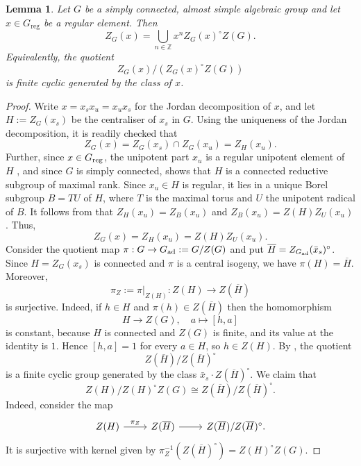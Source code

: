 \documentclass[12pt, a4paper, oneside]{amsart}
\theoremstyle{plain} %
\newtheorem{lemma}[theorem]{Lemma}
\theoremstyle{definition} %
\theoremstyle{remark} %
\begin{document}
\begin{lemma}\label{lem:regular-centraliser-components}
Let $G$ be a simply connected, almost simple algebraic group and let $x\in G_{\mathrm{reg}}$ be a regular element. Then
\[Z_G(x)=\bigcup_{ n\in\mathbb Z}x^{n}Z_G(x)^\circ Z(G).\]
Equivalently, the quotient
\[Z_G(x)/(Z_G(x)^\circ Z(G))\]
is finite cyclic generated by the class of $x$.
\end{lemma}
\begin{proof}
Write $x=x_sx_u=x_ux_s$ for the Jordan decomposition of $x$, and let $H:=Z_G(x_s)$ be the centraliser of $x_s$ in $G$.
Using the uniqueness of the Jordan decomposition, it is readily checked that
\[Z_G(x)=Z_G(x_s)\cap Z_G(x_u)=Z_H(x_u).\]
Further, since $x\in G_{\rm reg}$, the unipotent part $x_u$ is a regular unipotent element of $H$ \cite[Section 1.14]{Car93}, and since $G$ is simply connected, \cite[Theorem 2.11]{Hum95} shows that $H$ is a connected reductive subgroup of maximal rank. Since $x_u\in H$ is regular, it lies in a unique Borel subgroup $B=TU$ of $H$, where $T$ is the maximal torus and $U$ the unipotent radical of $B$. It follows from \cite[Proposition 4.1]{Hum95} that $Z_H(x_u) = Z_B(x_u)$ and $Z_B(x_u) = Z(H)Z_U(x_u)$. Thus, 
\[Z_G(x)=Z_H(x_u)=Z(H)Z_U(x_u).\]
Consider the quotient map $\pi:G\to G_{\rm ad}:=G/Z(G)$ and put $\overline{H}=Z_{G_{\rm ad}}(\bar{x}_s)^\circ$. Since $H = Z_G(x_s)$ is connected and $\pi$ is a central isogeny, we have $\pi(H) =\overline{H}$.  Moreover, 
\[\pi_Z:=\pi|_{Z(H)}:Z(H)\longrightarrow Z(\overline{H})\]
is surjective. Indeed, if $h\in H$ and $\pi(h)\in Z(\overline{H})$ then the homomorphism
\[H\longrightarrow Z(G),\quad a\longmapsto [h,a]\]
is constant, because $H$ is connected and $Z(G)$ is finite, and its value at the identity is $1$. Hence $[h,a]=1$ for every $a\in H$, so $h\in Z(H)$.
By \cite[Remark 3]{Som98}, the quotient
\[Z(\overline{H})/Z(\overline{H})^\circ\]
is a finite cyclic group generated by the class $\bar{x}_s\cdot Z(\overline{H})^\circ$. We claim that
\[Z(H)/Z(H)^\circ Z(G) \cong Z(\overline{H})/Z(\overline{H})^\circ.\]
Indeed, consider the map
\[\begin{tikzcd}[ampersand replacement=\&]
	{Z(H)} \& {Z(\overline{H})} \& {Z(\overline{H})/Z(\overline{H})^\circ.}
	\arrow["{\pi_Z}", from=1-1, to=1-2]
	\arrow[from=1-2, to=1-3]
\end{tikzcd}\]
It is surjective with kernel given by $\pi^{-1}_Z( Z(\overline{H})^\circ)=Z(H)^\circ Z(G)$.

\end{proof}
\end{document}
